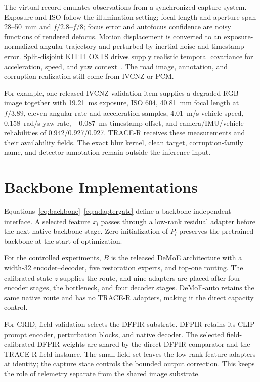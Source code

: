 \documentclass[journal]{IEEEtran}
\begin{document}
The virtual record emulates observations from a synchronized capture system. Exposure and ISO follow the illumination setting; focal length and aperture span 28--50~mm and $f/2.8$--$f/8$; focus error and autofocus confidence are noisy functions of rendered defocus. Motion displacement is converted to an exposure-normalized angular trajectory and perturbed by inertial noise and timestamp error. Split-disjoint KITTI OXTS drives supply realistic temporal covariance for acceleration, speed, and yaw context~\cite{geiger2012kitti}. The road image, annotation, and corruption realization still come from IVCNZ or PCM.

For example, one released IVCNZ validation item supplies a degraded RGB image together with 19.21~ms exposure, ISO 604, 40.81~mm focal length at $f/3.89$, eleven angular-rate and acceleration samples, 4.01~m/s vehicle speed, 0.158~rad/s yaw rate, $-0.087$~ms timestamp offset, and camera/IMU/vehicle reliabilities of 0.942/0.927/0.927. TRACE-R receives these measurements and their availability fields. The exact blur kernel, clean target, corruption-family name, and detector annotation remain outside the inference input.

\section{Backbone Implementations}
\label{sup:backbones}
Equations~\eqref{eq:backbone}--\eqref{eq:adaptergate} define a backbone-independent interface. A selected feature $x_l$ passes through a low-rank residual adapter before the next native backbone stage. Zero initialization of $P_l$ preserves the pretrained backbone at the start of optimization.

For the controlled experiments, $B$ is the released DeMoE architecture with a width-32 encoder--decoder, five restoration experts, and top-one routing. The calibrated state $z$ supplies the route, and nine adapters are placed after four encoder stages, the bottleneck, and four decoder stages. DeMoE-auto retains the same native route and has no TRACE-R adapters, making it the direct capacity control.

For CRID, field validation selects the DFPIR substrate. DFPIR retains its CLIP prompt encoder, perturbation blocks, and native decoder. The selected field-calibrated DFPIR weights are shared by the direct DFPIR comparator and the TRACE-R field instance. The small field set leaves the low-rank feature adapters at identity; the capture state controls the bounded output correction. This keeps the role of telemetry separate from the shared image substrate.
\end{document}
